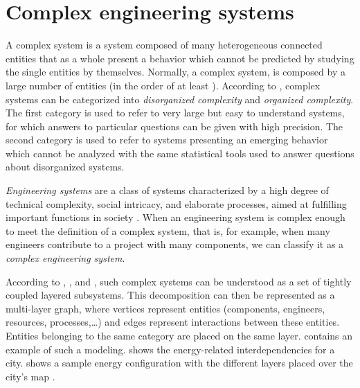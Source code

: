 
\section{Complex engineering systems}

A complex system is a system composed of many heterogeneous connected entities that as a whole present a behavior which cannot be predicted by studying the single entities by themselves. Normally, a complex system, is composed by a large number of entities (in the order of at least ). According to \citeauthor{systcomplex} \cite{systcomplex}, complex systems can be categorized into \emph{disorganized complexity} and \emph{organized complexity}. The first category is used to refer to very large but easy to understand systems, for which answers to particular questions can be given with high precision. The second category is used to refer to systems presenting an emerging behavior which cannot be analyzed with the same statistical tools used to answer questions about disorganized systems.

\emph{Engineering systems} are a class of systems characterized by a high degree of technical complexity, social intricacy, and elaborate processes, aimed at fulfilling important functions in society \cite{complex}. When an engineering system is complex enough to meet the definition of a complex system, that is, for example, when many engineers contribute to a project with many components, we can classify it as a \emph{complex engineering system}.

According to \citeauthor{decomp} \cite{decomp}, \citeauthor{complex} \cite{complex}, and \citeauthor{change-prop} \cite{change-prop}, such complex systems can be understood as a set of tightly coupled layered subsystems. This decomposition can then be represented as a multi-layer graph, where vertices represent entities (components, engineers, resources, processes,\ldots) and edges represent interactions between these entities. Entities belonging to the same category are placed on the same layer.  contains an example of such a modeling.  shows the energy-related interdependencies for a city.  shows a sample energy configuration with the different layers placed over the city's map \cite{citynet}.

